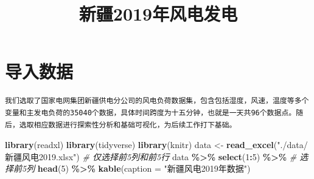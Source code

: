 \documentclass[
]{ctexart}
\title{新疆2019年风电发电}
\author{}
\date{\vspace{-2.5em}}
\newenvironment{Shaded}{\begin{snugshade}}{\end{snugshade}}
\newcommand{\AttributeTok}[1]{\textcolor[rgb]{0.13,0.29,0.53}{#1}}
\newcommand{\CommentTok}[1]{\textcolor[rgb]{0.56,0.35,0.01}{\textit{#1}}}
\newcommand{\DecValTok}[1]{\textcolor[rgb]{0.00,0.00,0.81}{#1}}
\newcommand{\FunctionTok}[1]{\textcolor[rgb]{0.13,0.29,0.53}{\textbf{#1}}}
\newcommand{\NormalTok}[1]{#1}
\newcommand{\OtherTok}[1]{\textcolor[rgb]{0.56,0.35,0.01}{#1}}
\newcommand{\SpecialCharTok}[1]{\textcolor[rgb]{0.81,0.36,0.00}{\textbf{#1}}}
\newcommand{\StringTok}[1]{\textcolor[rgb]{0.31,0.60,0.02}{#1}}
\begin{document}
\maketitle

{
\setcounter{tocdepth}{2}
\tableofcontents
}
\section{导入数据}\label{ux5bfcux5165ux6570ux636e}

\begin{verbatim}
我们选取了国家电网集团新疆供电分公司的风电负荷数据集，包含包括湿度，风速，温度等多个变量和主发电负荷的35040个数据，具体时间跨度为十五分钟，也就是一天共96个数据点。随后，选取相应数据进行探索性分析和基础可视化，为后续工作打下基础。
\end{verbatim}

\begin{Shaded}
\begin{Highlighting}[]
\FunctionTok{library}\NormalTok{(readxl)}
\FunctionTok{library}\NormalTok{(tidyverse)}
\FunctionTok{library}\NormalTok{(knitr)}
\NormalTok{data }\OtherTok{\textless{}{-}} \FunctionTok{read\_excel}\NormalTok{(}\StringTok{"./data/新疆风电2019.xlsx"}\NormalTok{)}
\CommentTok{\# 仅选择前5列和前5行}
\NormalTok{data }\SpecialCharTok{\%\textgreater{}\%}
  \FunctionTok{select}\NormalTok{(}\DecValTok{1}\SpecialCharTok{:}\DecValTok{5}\NormalTok{) }\SpecialCharTok{\%\textgreater{}\%} \CommentTok{\# 选择前5列}
  \FunctionTok{head}\NormalTok{(}\DecValTok{5}\NormalTok{) }\SpecialCharTok{\%\textgreater{}\%}
  \FunctionTok{kable}\NormalTok{(}\AttributeTok{caption =} \StringTok{"新疆风电2019年数据"}\NormalTok{)}
\end{Highlighting}
\end{Shaded}
\end{document}
